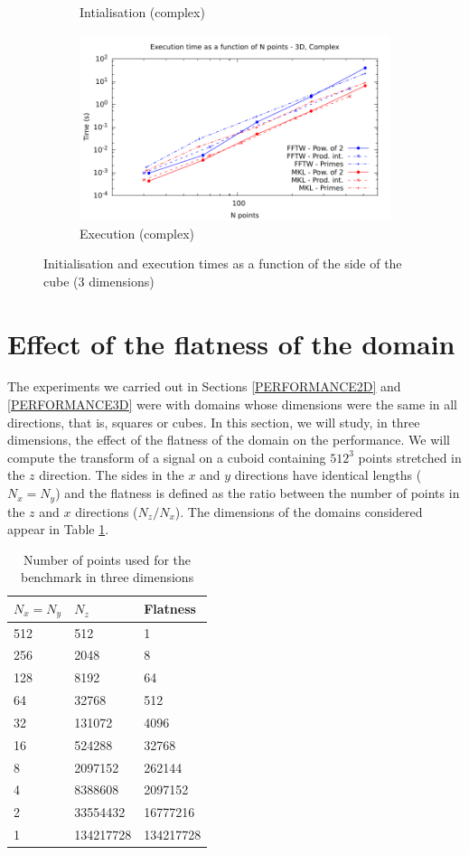 \documentclass[12pt, a4paper]{article}
\begin{document}
\begin{figure}[H]
\begin{subfigure}{.5\textwidth}
\caption{Intialisation (complex)}
\label{3DCI}
\end{subfigure}%
\begin{subfigure}{.5\textwidth}
\centering
\includegraphics[width=.9\linewidth]{graphs/3d-exec-c.pdf}
\caption{Execution (complex)}
\label{3DC}
\end{subfigure}
\caption{Initialisation and execution times as a function of the side of the cube (3 dimensions)}
\label{3D}
\end{figure}
\section{Effect of the flatness of the domain}\label{FLATNESS}

The experiments we carried out in Sections \ref{PERFORMANCE2D} and \ref{PERFORMANCE3D} were with domains whose dimensions were the same in all directions, that is, squares or cubes. In this section, we will study, in three dimensions, the effect of the flatness of the domain on the performance. We will compute the transform of a signal on a cuboid containing $512^3$ points stretched in the $z$ direction. The sides in the $x$ and $y$ directions have identical lengths ($N_x=N_y$) and the flatness is defined as the ratio between the number of points in the $z$ and $x$ directions ($N_z/N_x$). The dimensions of the domains considered appear in Table \ref{FLATNESSDIM}.
\begin{table}[H]
\centering
\begin{tabular}{|l|l|l|}
  \hline
  $N_x=N_y$ & $N_z $ & Flatness\\ 
  \hline
  \hline
512 & 512       & 1\\ \hline
256 & 2048      & 8\\ \hline
128 & 8192      & 64\\ \hline
64  & 32768     & 512\\ \hline
32  & 131072    & 4096\\ \hline
16  & 524288    & 32768\\ \hline
8   & 2097152   & 262144\\ \hline
4   & 8388608   & 2097152\\ \hline
2   & 33554432  & 16777216\\ \hline
1   & 134217728 & 134217728\\ \hline
\end{tabular}
\caption{Number of points used for the benchmark in three dimensions}\label{FLATNESSDIM}
\end{table}
\end{document}
